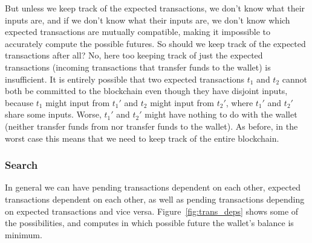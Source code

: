 \documentclass{article}
\begin{document}
But unless we keep track of the expected transactions, we don't know what their
inputs are, and if we don't know what their inputs are, we don't know which
expected transactions are mutually compatible, making it impossible to
accurately compute the possible futures. So should we keep track of the expected
transactions after all? No, here too keeping track of just the expected
transactions (incoming transactions that transfer funds to the wallet) is
insufficient. It is entirely possible that two expected transactions $t_1$ and
$t_2$ cannot both be committed to the blockchain even though they have disjoint
inputs, because $t_1$ might input from $t_1'$ and $t_2$ might input from $t_2'$,
where $t_1'$ and $t_2'$ share some inputs. Worse, $t_1'$ and $t_2'$ might have
nothing to do with the wallet (neither transfer funds from nor transfer funds to
the wallet). As before, in the worst case this means that we need to keep
track of the entire blockchain.

\subsubsection{Search}

In general we can have pending transactions dependent on each other, expected
transactions dependent on each other, as well as pending transactions depending
on expected transactions and vice versa. Figure~\ref{fig:trans_deps} shows
some of the possibilities, and computes in which possible future the wallet's
balance is minimum.
\end{document}
